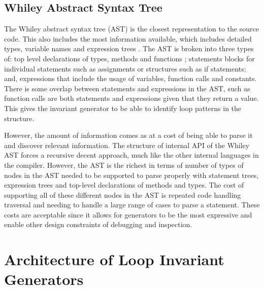 \subsection{Whiley Abstract Syntax Tree}

The Whiley abstract syntax tree (AST) is the closest representation to
the source code.
This also includes the most information available, which includes detailed
types, variable names and expression trees \cite{whiley-origin}.
The AST is broken into three types of: top level declarations of types,
methods and functions ; statements blocks for individual statements
such as assignments or structures such as if statements; and, expressions
that include the usage of variables, function calls and constants.
There is some overlap between statements and expressions in the AST,
such as function calls are both statements and expressions given that they
return a value.
This gives the invariant generator to be able to identify loop patterns in the
structure.

However, the amount of information comes as at a cost of being able to parse
it and discover relevant information.
The structure of internal API of the Whiley AST forces a recursive decent
approach, much like the other internal languages in the compiler.
However, the AST is the richest in terms of number of types of nodes
in the AST needed to be supported to parse properly with
statement trees, expression trees and top-level declarations of methods and
types.
The cost of supporting all of these different nodes in the AST is
repeated code handling traversal and needing to handle a large range
of cases to parse a statement.
These costs are acceptable since it allows for generators to be
the most expressive and enable other design constraints of
debugging and inspection.

\section{Architecture of Loop Invariant Generators}

